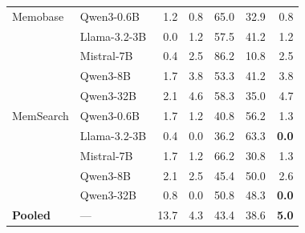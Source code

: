 \begin{table}[t]
\begin{tabular}{@{}l l r r r r r@{}}
\midrule
Memobase   & Qwen3-0.6B    & 1.2  & 0.8  & 65.0 & 32.9 & 0.8 \\
           & Llama-3.2-3B  & 0.0  & 1.2  & 57.5 & 41.2 & 1.2 \\
           & Mistral-7B    & 0.4  & 2.5  & 86.2 & 10.8 & 2.5 \\
           & Qwen3-8B      & 1.7  & 3.8  & 53.3 & 41.2 & 3.8 \\
           & Qwen3-32B     & 2.1  & 4.6  & 58.3 & 35.0 & 4.7 \\
\midrule
MemSearch  & Qwen3-0.6B    & 1.7  & 1.2  & 40.8 & 56.2 & 1.3 \\
           & Llama-3.2-3B  & 0.4  & 0.0  & 36.2 & 63.3 & \textbf{0.0} \\
           & Mistral-7B    & 1.7  & 1.2  & 66.2 & 30.8 & 1.3 \\
           & Qwen3-8B      & 2.1  & 2.5  & 45.4 & 50.0 & 2.6 \\
           & Qwen3-32B     & 0.8  & 0.0  & 50.8 & 48.3 & \textbf{0.0} \\
\midrule
\textbf{Pooled} & --- & 13.7 & 4.3 & 43.4 & 38.6 & \textbf{5.0} \\
\bottomrule
\end{tabular}
\end{table}
